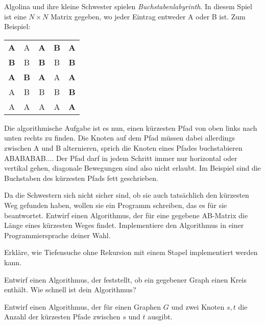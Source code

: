 \documentclass{uebung_cs}
\begin{document}
\begin{aufgabe}[Buchstabenlabyrinth]
	Algolina und ihre kleine Schwester spielen \emph{Buchstabenlabyrinth}.
	In diesem Spiel ist eine $N\times N$ Matrix gegeben, wo jeder Eintrag entweder A oder B ist. Zum Beispiel:
	\begin{center}
		\begin{tabular}{ccccc}
			\textbf{A} & A & \textbf{A} & \textbf{B} & \textbf{A}\\
			\textbf{B} & B & \textbf{B} & B & \textbf{B}\\
			\textbf{A} & \textbf{B} & \textbf{A} & A & \textbf{A}\\
			A & B & B & B & \textbf{B}\\
			A & A & A & A & \textbf{A}
		\end{tabular}
	\end{center}

	Die algorithmische Aufgabe ist es nun, einen kürzesten Pfad von oben links nach unten rechts zu finden.
	Die Knoten auf dem Pfad müssen dabei allerdings zwischen A und B alternieren, sprich die Knoten eines Pfades buchstabieren ABABABAB$\ldots$.
	Der Pfad darf in jedem Schritt immer nur horizontal oder vertikal gehen, diagonale Bewegungen sind also nicht erlaubt.
	Im Beispiel sind die Buchstaben des kürzesten Pfads fett geschrieben.

	Da die Schwestern sich nicht sicher sind, ob sie auch tatsächlich den kürzesten Weg gefunden haben, wollen sie ein Programm schreiben, das es für sie beantwortet.
	Entwirf einen Algorithmus, der für eine gegebene AB-Matrix die Länge eines kürzesten Weges findet.
	Implementiere den Algorithmus in einer Programmiersprache deiner Wahl.
\end{aufgabe}

\begin{aufgabe}
	Erkläre, wie Tiefensuche ohne Rekursion mit einem Stapel implementiert werden kann.
\end{aufgabe}

\begin{aufgabe}
	Entwirf einen Algorithmus, der feststellt, ob ein gegebener Graph einen Kreis enthält.
	Wie schnell ist dein Algorithmus?
\end{aufgabe}

\begin{aufgabe}
	Entwirf einen Algorithmus, der für einen Graphen $G$ und zwei Knoten $s,t$ die Anzahl der kürzesten Pfade zwischen $s$ und $t$ ausgibt.
\end{aufgabe}
\end{document}

